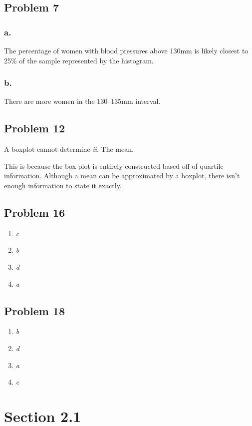 \documentclass[11pt]{article}
\begin{document}
\subsection*{Problem 7}
\subsubsection*{a.}
The percentage of women with blood pressures above 130mm is likely closest to
25\% of the sample represented by the histogram. 

\subsubsection*{b.}
There are more women in the 130--135mm interval.

\subsection*{Problem 12}
A boxplot cannot determine \textit{ii}. The mean.

This is because the box plot is entirely constructed based off of quartile
information. Although a mean can be approximated by a boxplot, there isn't
enough information to state it exactly. 

\subsection*{Problem 16}
\begin{enumerate}
    \item \textit{c}
    \item \textit{b}
    \item \textit{d}
    \item \textit{a}
\end{enumerate}

\subsection*{Problem 18}
\begin{enumerate}[i]
    \item \textit{b}
    \item \textit{d}
    \item \textit{a}
    \item \textit{c}
\end{enumerate}

\section*{Section 2.1}
\end{document}
